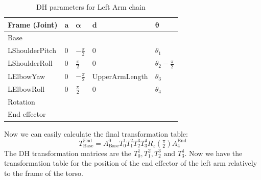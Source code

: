 \begin{table}[!h]
\centering
\begin{tabular}{|l|>{\centering\arraybackslash}m{2.55cm}|>{\centering\arraybackslash}m{2.55cm}|>{\centering\arraybackslash}m{2.55cm}|>{\centering\arraybackslash}m{2.55cm}|}
\hline
\textbf{Frame (Joint)} & \(\mathbf{a}\) & \(\boldsymbol{\alpha}\) & \(\mathbf{d}\) & \(\boldsymbol{\theta}\)\\ \hline
Base & \multicolumn{4}{|c|}{\(A(0,\text{\footnotesize{ShoulderOffsetY+ElbowOffsetY}},\text{\footnotesize{ShoulderOffsetZ}})\)} \\ \hline
LShoulderPitch & \(0\) & \(-\frac{\pi}{2}\) & \(0\) & \(\theta_1\) \\ \hline
LShoulderRoll & \(0\) & \(\frac{\pi}{2}\) & \(0\) & \(\theta_2 - \frac{\pi}{2}\) \\ \hline
LElbowYaw & \(0\) & \(-\frac{\pi}{2}\) & \footnotesize{UpperArmLength} & \(\theta_3\) \\ \hline
LElbowRoll & \(0\) & \(\frac{\pi}{2}\) & \(0\) & \(\theta_4\) \\ \hline
Rotation & \multicolumn{4}{c|}{\(R_z(\frac{\pi}{2})\)} \\ \hline
End effector & \multicolumn{4}{c|}{\(A(\text{\footnotesize{HandOffsetX+LowerArmLength}},0,0)\)} \\ \hline
\end{tabular}
\caption{DH parameters for Left Arm chain}
\label{tab:DH parameters for Left Arm chain}
\end{table}
Now we can easily calculate the final transformation table:
\[
T^\text{End}_\text{Base} = A^0_\text{Base}T^1_0T^2_1T^3_2T^4_3R_z(\tfrac{\pi}{2})A^\text{End}_{4}
\]
The DH transformation matrices are the \(T^1_0,T^2_1,T^3_2\text{ and }T^4_3\). Now we have the transformation table for the position of the end effector of the left arm relatively to the frame of the torso.

